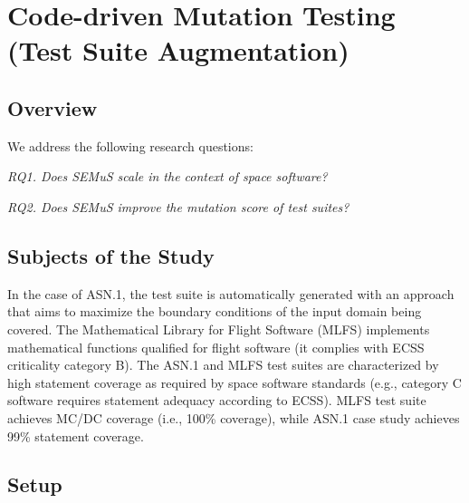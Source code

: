 \clearpage
\section{Code-driven Mutation Testing (Test Suite Augmentation)}
\label{sec:testGeneration:codeDriven}

\subsection{Overview}

We address the following research questions:

\emph{RQ1. Does SEMuS scale in the context of space software?}

\emph{RQ2. Does SEMuS improve the mutation score of test suites?}

\subsection{Subjects of the Study}

In the case of ASN.1, the test suite is automatically generated with an approach that aims to maximize the boundary conditions of the input domain being covered. 
The Mathematical Library for Flight Software (MLFS) implements mathematical functions qualified for flight software (it complies with ECSS criticality category B).
The ASN.1 and MLFS test suites are characterized by high statement coverage as required by space software standards (e.g., category C software requires statement adequacy according to ECSS). MLFS test suite achieves MC/DC coverage (i.e., 100\% coverage), while ASN.1 case study achieves 99\% statement coverage. 


\subsection{Setup}



